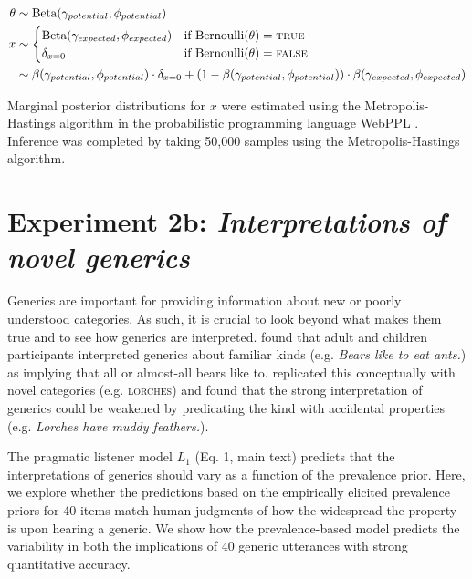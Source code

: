 \documentclass[10pt,letterpaper]{article}
\begin{document}
\begin{align*}
\theta & \sim \text{Beta}(\gamma_{potential}, \phi_{potential}) \\ 
x & \sim \begin{cases} 
		\text{Beta}(\gamma_{expected}, \phi_{expected}) &\mbox{if } \text{Bernoulli}(\theta) = \textsc{true} \\
				\delta_{x=0} &\mbox{if } \text{Bernoulli}(\theta) = \textsc{false} \\
		\end{cases} \\
	 &  \sim \beta(\gamma_{potential},\phi_{potential})  \cdot \delta_{x=0} + (1-\beta(\gamma_{potential},\phi_{potential}) ) \cdot \beta(\gamma_{expected},\phi_{expected})
\end{align*}

%
Marginal posterior distributions for $x$ were estimated using the Metropolis-Hastings algorithm in the probabilistic programming language WebPPL \cite{dippl}. Inference was completed by taking 50,000 samples using the Metropolis-Hastings algorithm.

\section{Experiment 2b: \emph{Interpretations of novel generics}}

Generics are important for providing information about new or poorly understood categories.
As such, it is crucial to look beyond what makes them true and to see how generics are interpreted.
 found that adult and children participants interpreted generics about familiar kinds (e.g. \emph{Bears like to eat ants.}) as implying that all or almost-all bears like to.
 replicated this conceptually with novel categories (e.g. \textsc{lorches}) and found that the strong interpretation of generics could be weakened by predicating the kind with accidental properties (e.g. \emph{Lorches have muddy feathers.}).

The pragmatic listener model $L_1$ (Eq. 1, main text) predicts that the interpretations of generics should vary as a function of the prevalence prior.
Here, we explore whether the predictions based on the empirically elicited prevalence priors for 40 items match human judgments of how the widespread the property is upon hearing a generic.
We show how the prevalence-based model predicts the variability in both the implications of 40 generic utterances with strong quantitative accuracy.
\end{document}
